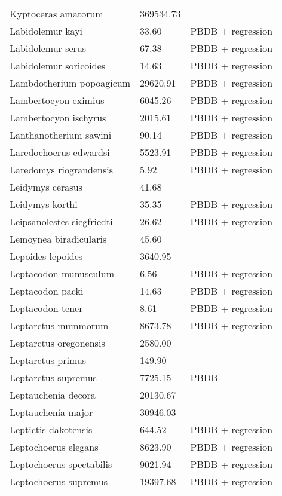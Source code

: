 \begin{center}
\begin{longtable}{p{} p{} p{} }
  Kyptoceras amatorum & 369534.73 & \cite{Tomiya2013} \\ 
  Labidolemur kayi & 33.60 & PBDB + regression \\ 
  Labidolemur serus & 67.38 & PBDB + regression \\ 
  Labidolemur soricoides & 14.63 & PBDB + regression \\ 
  Lambdotherium popoagicum & 29620.91 & PBDB + regression \\ 
  Lambertocyon eximius & 6045.26 & PBDB + regression \\ 
  Lambertocyon ischyrus & 2015.61 & PBDB + regression \\ 
  Lanthanotherium sawini & 90.14 & PBDB + regression \\ 
  Laredochoerus edwardsi & 5523.91 & PBDB + regression \\ 
  Laredomys riograndensis & 5.92 & PBDB + regression \\ 
  Leidymys cerasus & 41.68 & \cite{Tomiya2013} \\ 
  Leidymys korthi & 35.35 & PBDB + regression \\ 
  Leipsanolestes siegfriedti & 26.62 & PBDB + regression \\ 
  Lemoynea biradicularis & 45.60 & \cite{Tomiya2013} \\ 
  Lepoides lepoides & 3640.95 & \cite{Tomiya2013} \\ 
  Leptacodon munusculum & 6.56 & PBDB + regression \\ 
  Leptacodon packi & 14.63 & PBDB + regression \\ 
  Leptacodon tener & 8.61 & PBDB + regression \\ 
  Leptarctus mummorum & 8673.78 & PBDB + regression \\ 
  Leptarctus oregonensis & 2580.00 & \cite{McKenna2011} \\ 
  Leptarctus primus & 149.90 & \cite{Tomiya2013} \\ 
  Leptarctus supremus & 7725.15 & PBDB \\ 
  Leptauchenia decora & 20130.67 & \cite{Tomiya2013} \\ 
  Leptauchenia major & 30946.03 & \cite{Tomiya2013} \\ 
  Leptictis dakotensis & 644.52 & PBDB + regression \\ 
  Leptochoerus elegans & 8623.90 & PBDB + regression \\ 
  Leptochoerus spectabilis & 9021.94 & PBDB + regression \\ 
  Leptochoerus supremus & 19397.68 & PBDB + regression \\ 

\end{longtable}
\end{center}
